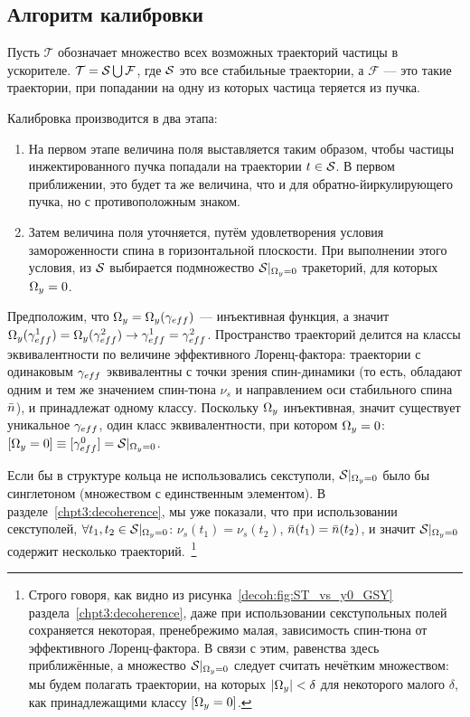 
\newcommand{\Traj}{\mathcal T}
\newcommand{\Fail}{\mathcal F}
\newcommand{\CO}{\mathrm{CO}}


\subsection{Алгоритм калибровки}
Пусть $\Traj$ обозначает множество всех возможных траекторий частицы в ускорителе. $\Traj = \Stab \bigcup \Fail$,
где $\Stab$ это все стабильные траектории, а $\Fail$ --- это такие траектории,
при попадании на одну из которых частица теряется из пучка.

Калибровка производится в два этапа:
\begin{enumerate}
\item На первом этапе величина поля выставляется таким образом, чтобы частицы инжектированного пучка
попадали на траектории $t\in \Stab$. В первом приближении, это будет та же величина,
что и для обратно-йиркулирующего пучка, но с противоположным знаком.
\item Затем величина поля уточняется, путём удовлетворения условия замороженности спина в горизонтальной
плоскости. При выполнении этого условия, из $\Stab$ выбирается подмножество $\Stab*$ тракеторий, для которых
$\Omega_y = 0$.
\end{enumerate}

Предположим, что $\W_y = \W_y(\g*)$ --- инъективная функция, а значит
$\W_y(\g*^1) = \W_y(\g*^2) \rightarrow \g*^1 = \g*^2$. Пространство траекторий делится на
классы эквивалентности по величине эффективного Лоренц-фактора: траектории с одинаковым $\g*$ эквивалентны
с точки зрения спин-динамики (то есть, обладают одним и тем же значением спин-тюна $\nu_s$ и направлением
оси стабильного спина $\bar n$), и принадлежат одному классу. Поскольку $\Omega_y$ инъективная, значит существует
уникальное $\g*$, один класс эквивалентности, при котором $\Omega_y=0$: $[\W_y=0]\equiv [\g*^0] = \Stab*$.

Если бы в структуре кольца не использовались секступоли, $\Stab*$ было бы синглетоном (множеством с
единственным элементом). В разделе~\ref{chpt3:decoherence}, мы уже показали, что
при использовании секступолей, $\forall t_1,t_2\in\Stab*$:
$\nu_s(t_1) = \nu_s(t_2)$, $\bar n(t_1) = \bar n(t_2)$, и значит $\Stab*$ содержит
несколько траекторий.~\footnote{Строго говоря, как видно из рисунка~\ref{decoh:fig:ST_vs_y0_GSY}
раздела~\ref{chpt3:decoherence}, даже при использовании секступольных полей сохраняется некоторая,
пренебрежимо малая, зависимость спин-тюна от эффективного Лоренц-фактора. В связи с этим, равенства
здесь приближённые, а множество $\Stab*$ следует считать нечётким множеством: мы будем полагать траектории,
на которых $|\Omega_y| < \delta$ для некоторого малого $\delta$, как принадлежащими классу $[\Omega_y=0]$.}

